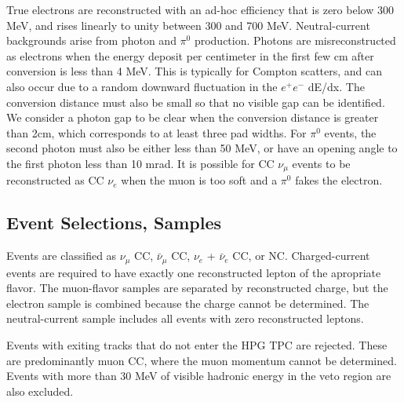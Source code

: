 True electrons are reconstructed with an ad-hoc efficiency that is zero below 300 MeV, and rises linearly to unity between 300 and 700 MeV. Neutral-current backgrounds arise from photon and $\pi^{0}$ production. Photons are misreconstructed as electrons when the energy deposit per centimeter in the first few cm after conversion is less than 4 MeV. This is typically for Compton scatters, and can also occur due to a random downward fluctuation in the $e^{+}e^{-}$ dE/dx. The conversion distance must also be small so that no visible gap can be identified. We consider a photon gap to be clear when the conversion distance is greater than 2cm, which corresponds to at least three pad widths. For $\pi^{0}$ events, the second photon must also be either less than 50 MeV, or have an opening angle to the first photon less than 10 mrad. It is possible for CC $\nu_{\mu}$ events to be reconstructed as CC $\nu_{e}$ when the muon is too soft and a $\pi^{0}$ fakes the electron.


\subsection{Event Selections, Samples}

Events are classified as $\nu_{\mu}$ CC, $\bar{\nu}_{\mu}$ CC, $\nu_{e}$ + $\bar{\nu}_{e}$ CC, or NC. Charged-current events are required to have exactly one reconstructed lepton of the apropriate flavor. The muon-flavor samples are separated by reconstructed charge, but the electron sample is combined because the charge cannot be determined. The neutral-current sample includes all events with zero reconstructed leptons.

Events with exiting tracks that do not enter the HPG TPC are rejected. These are predominantly muon CC, where the muon momentum cannot be determined. Events with more than 30 MeV of visible hadronic energy in the veto region are also excluded.

